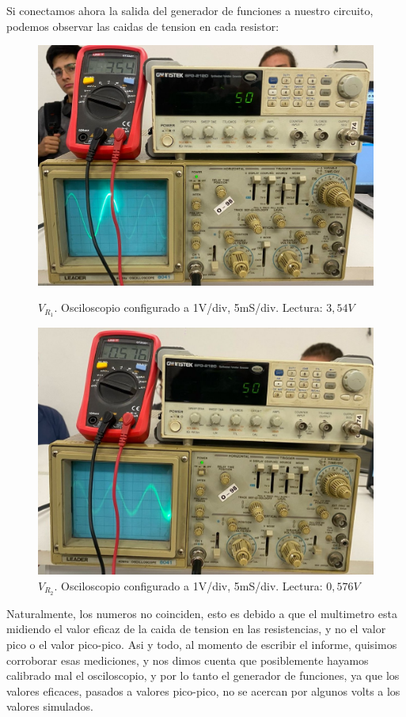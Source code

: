 \documentclass[a4paper,12pt, spanish]{report}
\begin{document}
      Si conectamos ahora la salida del generador de funciones a nuestro circuito, podemos observar las caidas de
      tension en cada resistor:
      \begin{figure}[!h]
        \centering
        \begin{minipage}{0.45\textwidth}
          \includegraphics[width=1\linewidth]{pictures/osc-mult-ac_v_r1.jpeg}
          \caption{$V_{R_1}$. Osciloscopio configurado a 1V/div, 5mS/div. Lectura: $3,54V$}
        \end{minipage}
        \hspace{0.5cm}
        \begin{minipage}{0.45\textwidth}
          \includegraphics[width=1\linewidth]{pictures/osc-ac-mult-v_r2-r3.jpeg}
          \caption{$V_{R_2}$. Osciloscopio configurado a 1V/div, 5mS/div. Lectura: $0,576V$}
        \end{minipage}
      \end{figure}

      Naturalmente, los numeros no coinciden, esto es debido a que el multimetro esta midiendo el valor eficaz de la
      caida de tension en las resistencias, y no el valor pico o el valor pico-pico. Asi y todo, al momento de escribir
      el informe, quisimos corroborar esas mediciones, y nos dimos cuenta que posiblemente hayamos calibrado mal el
      osciloscopio, y por lo tanto el generador de funciones, ya que los valores eficaces, pasados a valores pico-pico,
      no se acercan por algunos volts a los valores simulados.
\end{document}
